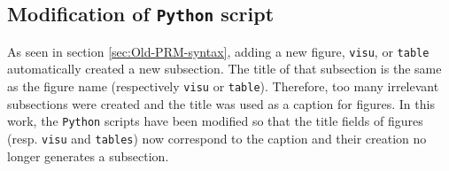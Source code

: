 \subsection{\label{subsec:Modification-of-Python}Modification of \texttt{Python}
script}
As seen in section \ref{sec:Old-PRM-syntax}, adding a new figure,
\texttt{visu}, or \texttt{table} automatically created
a new subsection. The title of that subsection is the same as the
figure name (respectively \texttt{visu} or \texttt{table}). Therefore,
too many irrelevant subsections were created and the title was used
as a caption for figures. In this work, the \texttt{Python} scripts
have been modified so that the title fields of figures (resp. \texttt{visu}
and \texttt{tables}) now correspond to the caption and their creation
no longer generates a subsection.\medskip\newline

